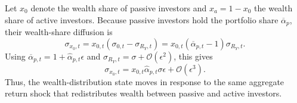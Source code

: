Let $x_0$ denote the wealth share of passive investors and $x_a=1-x_0$ the wealth share of active investors.
Because passive investors hold the portfolio share $\overline{\alpha}_p$, their wealth-share diffusion is
\begin{equation}\label{eq:sigmax0-portfolio-flow}
    \sigma_{x_0,t}
    =x_{0,t}\left(\sigma_{0,t}-\sigma_{R_Y,t}\right)
    =x_{0,t}\left(\overline{\alpha}_{p,t}-1\right)\sigma_{R_Y,t}.
\end{equation}
Using $\overline{\alpha}_{p,t}=1+\hat{\alpha}_{p,t}\epsilon$ and $\sigma_{R_Y,t}=\sigma+\mathcal{O}(\epsilon^2)$, this gives
\begin{equation}\label{eq:sigmax0-leading}
    \sigma_{x_0,t}
    =x_{0,t}\hat{\alpha}_{p,t}\sigma\epsilon+\mathcal{O}(\epsilon^3).
\end{equation}
Thus, the wealth-distribution state moves in response to the same aggregate return shock that redistributes wealth between passive and active investors.

